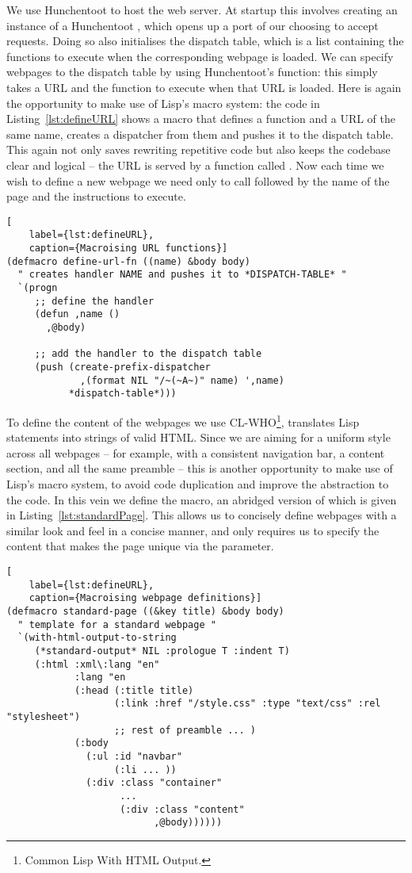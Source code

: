 We use Hunchentoot to host the web server. At startup this involves creating an
instance of a Hunchentoot , which opens up a port of our
choosing to accept requests. Doing so also initialises the dispatch table,
which is a list containing the functions to execute when the corresponding
webpage is loaded. We can specify webpages to the dispatch table by using
Hunchentoot's  function: this simply takes a URL
and the function to execute when that URL is loaded. Here is again the
opportunity to make use of Lisp's macro system: the code in
Listing~\ref{lst:defineURL} shows a macro that defines a function and a URL of
the same name, creates a dispatcher from them and pushes it to the dispatch
table. This again not only saves rewriting repetitive code but also keeps the
codebase clear and logical -- the URL  is served by a function
called . Now each time we wish to define a new webpage we need only
to call  followed by the name of the page and the
instructions to execute.

\begin{lstlisting}[
	label={lst:defineURL},
	caption={Macroising URL functions}]
(defmacro define-url-fn ((name) &body body)
  " creates handler NAME and pushes it to *DISPATCH-TABLE* "
  `(progn
     ;; define the handler
     (defun ,name ()
       ,@body)

     ;; add the handler to the dispatch table
     (push (create-prefix-dispatcher
             ,(format NIL "/~(~A~)" name) ',name)
           *dispatch-table*)))
\end{lstlisting}

To define the content of the webpages we use CL-WHO\footnote{Common Lisp With
HTML Output.}, translates Lisp statements into strings of valid HTML. Since we
are aiming for a uniform style across all webpages -- for example, with a
consistent navigation bar, a content section, and all the same preamble -- this
is another opportunity to make use of Lisp's macro system, to avoid code
duplication and improve the abstraction to the code. In this vein we define the
 macro, an abridged version of which is given in
Listing~\ref{lst:standardPage}. This allows us to concisely define webpages
with a similar look and feel in a concise manner, and only requires us to
specify the content that makes the page unique via the  parameter.

\begin{lstlisting}[
	label={lst:defineURL},
	caption={Macroising webpage definitions}]
(defmacro standard-page ((&key title) &body body)
  " template for a standard webpage "
  `(with-html-output-to-string
     (*standard-output* NIL :prologue T :indent T)
     (:html :xml\:lang "en"
            :lang "en
            (:head (:title title)
                   (:link :href "/style.css" :type "text/css" :rel "stylesheet")
                   ;; rest of preamble ... )
            (:body
              (:ul :id "navbar"
                   (:li ... ))
              (:div :class "container"
                    ...
                    (:div :class "content"
                          ,@body))))))
\end{lstlisting}

